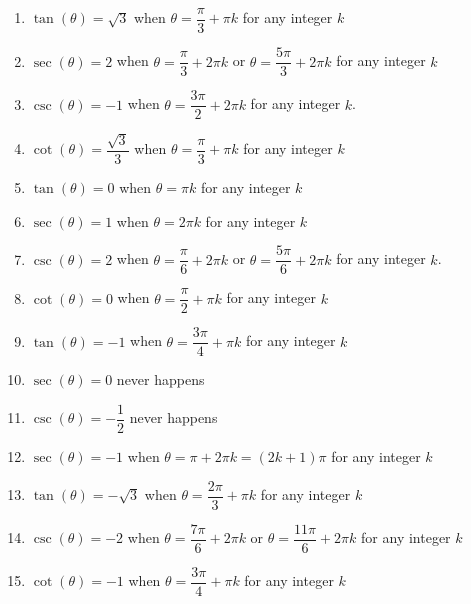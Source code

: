\begin{enumerate}

\setcounter{enumi}{\value{HW}}

\item $\tan(\theta) = \sqrt{3}$ when $\theta = \dfrac{\pi}{3} + \pi k$ for any integer $k$
\item $\sec(\theta) = 2$ when $\theta = \dfrac{\pi}{3} + 2\pi k$ or $\theta = \dfrac{5\pi}{3} + 2\pi k$ for any integer $k$
\item $\csc(\theta) = -1$ when $\theta = \dfrac{3\pi}{2} + 2\pi k$ for any integer $k$.
\item $\cot(\theta) = \dfrac{\sqrt{3}}{3}$ when $\theta = \dfrac{\pi}{3} + \pi k$ for any integer $k$
\item $\tan(\theta) = 0$ when $\theta = \pi k$ for any integer $k$
\item $\sec(\theta) = 1$ when $\theta = 2\pi k$ for any integer $k$
\item $\csc(\theta) = 2$ when $\theta = \dfrac{\pi}{6} + 2\pi k$ or $\theta = \dfrac{5\pi}{6} + 2\pi k$ for any integer $k$.
\item $\cot(\theta) = 0$ when $\theta = \dfrac{\pi}{2} + \pi k$ for any integer $k$
\item $\tan(\theta) = -1$ when $\theta = \dfrac{3\pi}{4} + \pi k$ for any integer $k$
\item $\sec(\theta) = 0$ never happens 
\item $\csc(\theta) = -\dfrac{1}{2}$ never happens
\item  $\sec(\theta) = -1$ when $\theta = \pi + 2\pi k = (2k+1)\pi$ for any integer $k$
\item  $\tan(\theta) = -\sqrt{3}$ when $\theta = \dfrac{2\pi}{3} + \pi k$ for any integer $k$
\item  $\csc(\theta) = -2$ when $\theta = \dfrac{7\pi}{6} + 2\pi k$ or $\theta = \dfrac{11\pi}{6} + 2\pi k$ for any integer $k$
\item  $\cot(\theta) = -1$ when $\theta = \dfrac{3\pi}{4} + \pi k$ for any integer $k$

\setcounter{HW}{\value{enumi}}

\end{enumerate}

